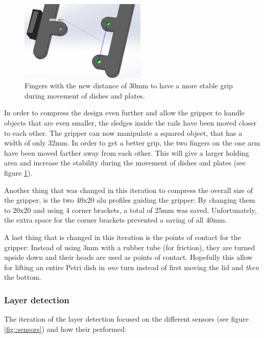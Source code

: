 \documentclass[10pt,a4paper]{article}
\begin{document}
			\begin{figure}
				\includegraphics[width=6cm]{images/fingersFartherAway.png}
				\caption{Fingers with the new distance of 30mm to have a more stable grip during movement of dishes and plates.}
				\label{fig::fingersFartherAway}
			\end{figure}
			
			In order to compress the design even further and allow the gripper to handle objects that are even smaller, the sledges inside the rails have been moved closer to each other. The gripper can now manipulate a squared object, that has a width of only 32mm. In order to get a better grip, the two fingers on the one arm have been moved farther away from each other. This will give a larger holding area and increase the stability during the movement of dishes and plates (see figure \ref{fig::fingersFartherAway}). 
			
			Another thing that was changed in this iteration to compress the overall size of the gripper, is the two 40x20 alu profiles guiding the gripper: By changing them to 20x20 and using 4 corner brackets, a total of 25mm was saved. Unfortunately, the extra space for the corner brackets prevented a saving of all 40mm.
			
			A last thing that is changed in this iteration is the points of contact for the gripper: Instead of using 3mm with a rubber tube (for friction), they are turned upside down and their heads are used as points of contact. Hopefully this allow for lifting an entire Petri dish in \textit{one} turn instead of first moving the lid and \textit{then} the bottom.
				
		
				
		\subsubsection{Layer detection}\label{subsub::1iterationLayerDetection}
		The iteration of the layer detection focused on the different sensors (see figure \ref{fig::sensors}) and how their performed:
		
		
		
\end{document}
